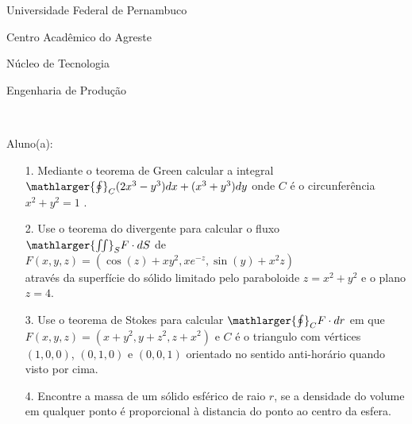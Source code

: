 \documentclass[oneside,a4paper,12pt]{article}
\newcommand{\universidade}{Universidade Federal de Pernambuco}
\newcommand{\centro}{Centro Acadêmico do Agreste}
\newcommand{\departamento}{Núcleo de Tecnologia}
\newcommand{\curso}{Engenharia de Produção}
\begin{document}
	\pagestyle{empty}
	
	\begin{center}
	 	\vspace{0pt}
	 	
		\universidade
		\par
		\centro
		\par
		\departamento
		\par
		\curso
		\par
		\vspace{08pt}
		\\
	\end{center}
	
	
	\begin{flushleft}
		Aluno(a):
	\end{flushleft}
	
\begin{itemize}
\item[1.] Mediante o teorema de Green calcular a integral $\mathlarger{\oint}_{C} (2x^{3}-y^{3})dx+(x^{3}+y^{3})dy$ onde $C$ é o circunferência $x^{2}+y^{2}=1$ .
\end{itemize}
\begin{itemize}
\item[2.] Use o teorema do divergente para calcular o fluxo $\mathlarger{\iint}_{S}F\cdot dS$ de\\ $F(x,y,z)=(\cos(z)+xy^{2},xe^{-z},\sin(y)+x^{2}z)$\\ através da superfície do sólido limitado pelo paraboloide $z=x^2+y^2$ e o plano $z=4$. 
 \end{itemize}
 \begin{itemize}
\item [3.] Use o teorema de Stokes para calcular $\mathlarger{\oint}_{C} {F}\cdot dr$ em que\\ 
$F(x,y,z)=(x+y^{2},y+z^{2},z+x^{2})$ e $C$ é o triangulo com vértices $(1,0,0)$, $(0,1,0)$ e $(0,0,1)$ orientado no sentido anti-horário quando visto por cima.
\end{itemize}
\begin{itemize}
\item[4.] Encontre a massa de um sólido esférico de raio $r$, se a densidade do volume em qualquer ponto é proporcional à distancia do ponto ao centro da esfera.
\end{itemize}
\end{document}
